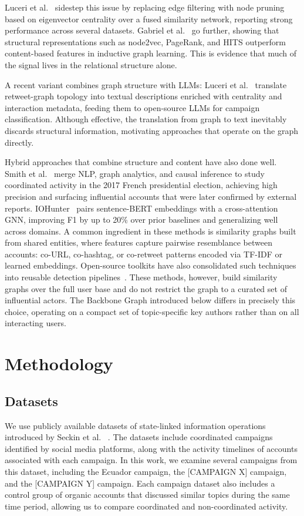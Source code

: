 \documentclass[10pt,journal,compsoc]{IEEEtran}
\begin{document}
Luceri et al.~\cite{luceri2024unmasking} sidestep this issue by replacing edge filtering with node pruning based on eigenvector centrality over a 
fused similarity network, reporting strong performance across several datasets. Gabriel et al.~\cite{gabriel2023inductive} go further, showing 
that structural representations such as node2vec, PageRank, and HITS outperform content-based features in inductive graph learning. This is evidence
that much of the signal lives in the relational structure alone.

A recent variant combines graph structure with LLMs: Luceri et al.~\cite{luceri2024leveraging} translate retweet-graph topology into textual descriptions enriched with centrality and interaction metadata, feeding them to open-source LLMs for campaign classification. Although effective, the translation from graph to text inevitably discards structural information, motivating approaches that operate on the graph directly.

Hybrid approaches that combine structure and content have also done well.
Smith et al.~\cite{smith2021automatic} merge NLP, graph analytics, and causal inference 
to study coordinated activity in the 2017 French presidential election, 
achieving high precision and surfacing influential accounts that were later confirmed by external reports. IOHunter~\cite{minici2025iohunter} 
pairs sentence-BERT embeddings with a cross-attention GNN, improving F1 by up to 20\% over prior baselines and generalizing well across domains. 
A common ingredient in these methods is similarity graphs built from shared entities, where features capture pairwise resemblance between
accounts: co-URL, co-hashtag, or co-retweet patterns encoded via TF-IDF or learned embeddings. Open-source toolkits have also consolidated such techniques into reusable detection pipelines~\cite{toolkit2024coordination}. These methods, however, build similarity graphs over the full user base and do not restrict the graph to a curated set of influential actors. The Backbone Graph introduced below differs in precisely this choice, operating on a compact set of topic-specific key authors rather than on all interacting users.


\section{Methodology}
\subsection{Datasets}
We use publicly available datasets of state-linked information operations introduced by Seckin et al.~\cite{seckin2025labeled} . The datasets include coordinated campaigns identified by social media platforms, along with the activity timelines of accounts associated with each campaign. In this work, we examine several campaigns from this dataset, including the Ecuador campaign, the [CAMPAIGN X] campaign, and the [CAMPAIGN Y] campaign. Each campaign dataset also includes a control group of organic accounts that discussed similar topics during the same time period, allowing us to compare coordinated and non-coordinated activity.
\end{document}
